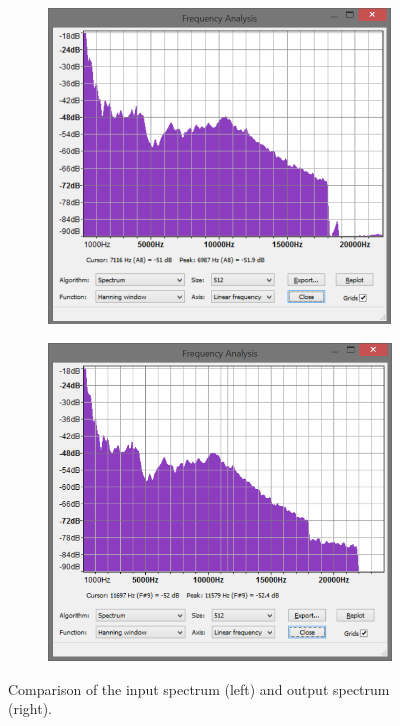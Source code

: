 \documentclass[a4paper,twoside,11pt, fleqn]{article}
\begin{document}
\begin{figure}[h]
	\begin{subfigure}[b]{0.6\textwidth}	
		\includegraphics[scale=0.5]{Images/simulation_frequencyspectrum_input.png}
	\end{subfigure}
	\begin{subfigure}[b]{0.6\textwidth}	
		\includegraphics[scale=0.5]{Images/simulation_frequencyspectrum_output.png}
	\end{subfigure}
    \caption{Comparison of the input spectrum (left) and output spectrum (right).}
\end{figure}
\clearpage
\end{document}
